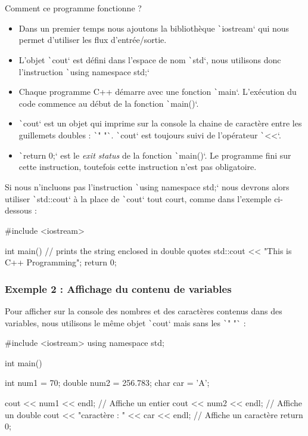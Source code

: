 \documentclass[10pt]{article}
\begin{document}
Comment ce programme fonctionne ?
\begin{itemize}
    \item Dans un premier temps nous ajoutons la bibliothèque \texttt`iostream` qui nous permet d'utiliser les flux d'entrée/sortie.
    \item L'objet \texttt`cout` est défini dans l'espace de nom \texttt`std`, nous utilisons donc l'instruction \texttt`using namespace std;`
    \item Chaque programme C++ démarre avec une fonction \texttt`main`. L'exécution du code commence au début de la fonction \texttt`main()`.
    \item \texttt`cout` est un objet qui imprime sur la console la chaine de caractère entre les guillemets doubles : \texttt`" "`. \texttt`cout` est toujours suivi de l'opérateur \texttt`<<`.
    \item \texttt`return 0;`  est le \textit{exit status} de la fonction \texttt`main()`. Le programme fini sur cette instruction, toutefois cette instruction n'est pas obligatoire.
\end{itemize}

\begin{noteblock}
    Si nous n'incluons pas l'instruction \texttt`using namespace std;` nous devrons alors utiliser \texttt`std::cout` à la place de \texttt`cout` tout court, comme dans l'exemple ci-dessous :

\begin{cppcode}
    #include <iostream>

    int main() {
    // prints the string enclosed in double quotes
    std::cout << "This is C++ Programming";
    return 0;
    }
\end{cppcode}
\end{noteblock}


\subsubsection{Exemple 2 : Affichage du contenu de variables}
Pour afficher sur la console des nombres et des caractères contenus dans des variables, nous utilisons le même objet \texttt`cout` mais sans les \texttt`" "` :

\begin{cppcode}
    #include <iostream>
    using namespace std;

    int main() {
        int num1 = 70;
        double num2 = 256.783;
        char car = 'A';

        cout << num1 << endl;    // Affiche un entier
        cout << num2 << endl;    // Affiche un double
        cout << "caractère : " << car << endl;    // Affiche un caractère
        return 0;
    }
\end{cppcode}
\end{document}
